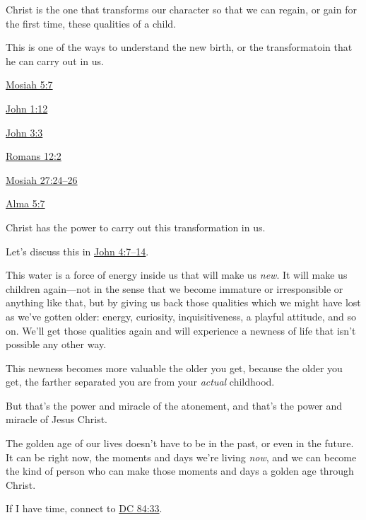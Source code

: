 \begin{compactitem}
\begin{compactitem}
				\end{compactitem}
			\item Christ is the one that transforms our character so that we can regain, or gain for the first time, these qualities of a child.
				\begin{compactitem}
					\item This is one of the ways to understand the new birth, or the transformatoin that he can carry out in us.
						\begin{compactitem}
							\item \hyperref[MOSIAH-5-7]{Mosiah 5:7}
							\item \hyperref[JOHN-1-12]{John 1:12}
							\item \hyperref[JOHN-3-3]{John 3:3}
							\item \hyperref[ROMANS-12-2]{Romans 12:2}
							\item \hyperref[MOSIAH-27-24]{Mosiah 27:24--26}
							\item \hyperref[ALMA-5-7]{Alma 5:7}
						\end{compactitem}
					\item Christ has the power to carry out this transformation in us.
						\begin{compactitem}
							\item Let's discuss this in \hyperref[JOHN-4-7]{John 4:7--14}.
						\end{compactitem}
					\item This water is a force of energy inside us that will make us \textit{new}. It will make us children again---not in the sense that we become immature or irresponsible or anything like that, but by giving us back those qualities which we might have lost as we've gotten older: energy, curiosity, inquisitiveness, a playful attitude, and so on. We'll get those qualities again and will experience a newness of life that isn't possible any other way.
					\item This newness becomes more valuable the older you get, because the older you get, the farther separated you are from your \textit{actual} childhood.
					\item But that's the power and miracle of the atonement, and that's the power and miracle of Jesus Christ.
					\item The golden age of our lives doesn't have to be in the past, or even in the future. It can be right now, the moments and days we're living \textit{now}, and we can become the kind of person who can make those moments and days a golden age through Christ.
				\end{compactitem}
			\item If I have time, connect to \hyperref[DC84-33]{DC 84:33}.
		\end{compactitem}